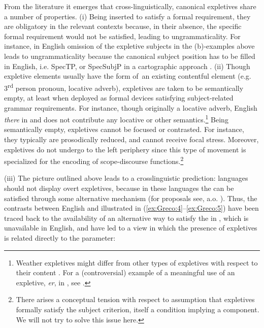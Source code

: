 \documentclass[output=paper]{LSP/langsci}
\begin{document}
From the literature it emerges that cross-linguistically, canonical expletives share a number of properties. (i) Being inserted to satisfy a formal requirement, they are obligatory in the relevant contexts because, in their absence, the specific formal requirement would not be satisfied, leading to ungrammaticality. For instance, in English omission of the expletive subjects in the (b)-examples above leads to ungrammaticality because the canonical subject position has to be filled in English, i.e. SpecTP, or SpecSubjP in a cartographic approach \citep{Rizzi2007}. (ii) Though expletive elements usually have the form of~an existing contentful element (e.g. 3\textsuperscript{rd} person pronoun, locative adverb), expletives are taken to be semantically empty, at least when deployed as formal devices satisfying subject-related grammar requirements. For instance, though originally a locative adverb, English \textit{there} in  and  does not contribute any locative or other semantics.\footnote{Weather expletives might differ from other types of expletives with respect to their  content \citep{Bolinger1977}. For a (controversial) example of a meaningful use of an expletive, \textit{er}, in , see \citet{Mohr2005}.} Being semantically empty, expletives cannot be focused or contrasted. For instance, they typically are prosodically reduced, and cannot receive focal stress. Moreover, expletives do not undergo  to the left periphery since this type of movement is specialized for the encoding of scope-discourse functions{.}\footnote{There arises a conceptual tension with respect to  assumption that expletives formally satisfy the subject criterion, itself a condition implying a  component. We will not try to solve this issue here.}

(iii) The picture outlined above leads to a crosslinguistic prediction:  languages should not display overt expletives, because in these languages the  can be satisfied through some alternative mechanism (for proposals see, a.o. \citealt{Rizzi1982,AlexiadouAnagnostopoulou1998,HolmbergEtAl2009}). Thus, the contrasts between English and  illustrated in (\ref{ex:Greco:4}--\ref{ex:Greco:5}) have been traced back to the availability of an alternative way to satisfy the  in , which is unavailable in English, and have led to a view in which the presence of expletives is related directly to the  parameter:
\end{document}
